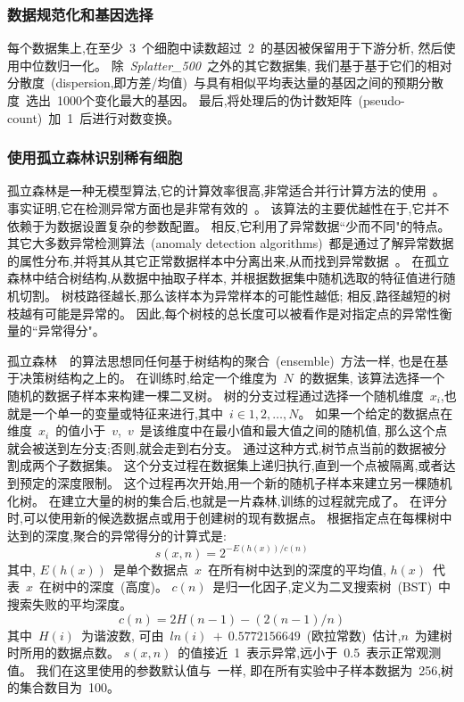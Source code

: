 \subsubsection{数据规范化和基因选择}
\label{subsec:datapreprocessing} 
每个数据集上,在至少~3~个细胞中读数超过~2~的基因被保留用于下游分析,
然后使用中位数归一化。
除~\textit{Splatter\_500}~之外的其它数据集,
我们基于基于它们的相对分散度~(dispersion,即方差/均值)~与具有相似平均表达量的基因之间的预期分散度~\cite{zheng2017massively,macosko2015highly}选出~1000个变化最大的基因。
最后,将处理后的伪计数矩阵~(pseudo-count)~加~1~后进行对数变换。

\subsubsection{使用孤立森林识别稀有细胞}
\label{subsec:if} 

孤立森林是一种无模型算法,它的计算效率很高,非常适合并行计算方法的使用~\cite{hariri2018batch}。
事实证明,它在检测异常方面也是非常有效的~\cite{susto2017anomaly}。
该算法的主要优越性在于,它并不依赖于为数据设置复杂的参数配置。
相反,它利用了异常数据``少而不同"的特点。
其它大多数异常检测算法~(anomaly detection algorithms)~都是通过了解异常数据的属性分布,并将其从其它正常数据样本中分离出来,从而找到异常数据~\cite{noto2010anomaly,chen2011ordinal,das2016incorporating}。
在孤立森林中结合树结构,从数据中抽取子样本,
并根据数据集中随机选取的特征值进行随机切割。
树枝路径越长,那么该样本为异常样本的可能性越低;
相反,路径越短的树枝越有可能是异常的。
因此,每个树枝的总长度可以被看作是对指定点的异常性衡量的``异常得分"。

孤立森林~\cite{liu2008isolation,liu2012isolation}~的算法思想同任何基于树结构的聚合~(ensemble)~方法一样,
也是在基于决策树结构之上的。
在训练时,给定一个维度为~$N$~的数据集,
该算法选择一个随机的数据子样本来构建一棵二叉树。
树的分支过程通过选择一个随机维度~$x_i$,也就是一个单一的变量或特征来进行,其中~$i \in {1,2,\ldots,N}$。
如果一个给定的数据点在维度~$x_i$~的值小于~$v$,~$v$~是该维度中在最小值和最大值之间的随机值,
那么这个点就会被送到左分支;否则,就会走到右分支。
通过这种方式,树节点当前的数据被分割成两个子数据集。
这个分支过程在数据集上递归执行,直到一个点被隔离,或者达到预定的深度限制。
这个过程再次开始,用一个新的随机子样本来建立另一棵随机化树。
在建立大量的树的集合后,也就是一片森林,训练的过程就完成了。
在评分时,可以使用新的候选数据点或用于创建树的现有数据点。
根据指定点在每棵树中达到的深度,聚合的异常得分的计算式是:
\begin{equation}
    \label{as}
    s(x,n) = 2^{-E(h(x))/c(n)}
\end{equation}
其中, $E(h(x))$~是单个数据点~$x$~在所有树中达到的深度的平均值, $h(x)$~代表~$x$~在树中的深度~(高度)。 
$c(n)$~是归一化因子,定义为二叉搜索树~(BST)~中搜索失败的平均深度。
\begin{equation}
    \label{lab:as}
    c(n) = 2H(n - 1) - (2(n - 1)/n)
\end{equation}
其中~$H(i)$~为谐波数,
可由~$ln(i)~+~0.5772156649$~(欧拉常数)~\cite{liu2012isolation}估计,$n$~为建树时所用的数据点数。
$s(x,n)$~的值接近~1~表示异常,远小于~0.5~表示正常观测值。
我们在这里使用的参数默认值与~\cite{liu2008isolation,liu2012isolation}一样,
即在所有实验中子样本数据为~256,树的集合数目为~100。

